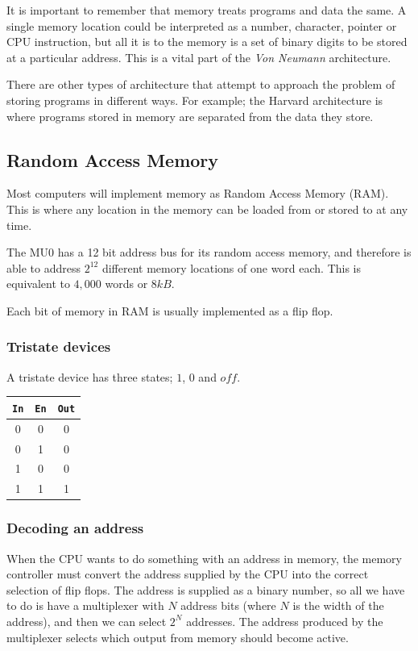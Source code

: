 It is important to remember that memory treats programs and data the same. A
single memory location could be interpreted as a number, character, pointer or
CPU instruction, but all it is to the memory is a set of binary digits to be
stored at a particular address. This is a vital part of the {\it Von Neumann}
architecture.

There are other types of architecture that attempt to approach the problem of
storing programs in different ways. For example; the Harvard architecture is
where programs stored in memory are separated from the data they store.

\subsection{Random Access Memory}

Most computers will implement memory as Random Access Memory (RAM). This is
where any location in the memory can be loaded from or stored to at any time.

The MU0 has a 12 bit address bus for its random access memory, and therefore is
able to address $2^12$ different memory locations of one word each. This is
equivalent to $4,000$ words or $8kB$.

Each bit of memory in RAM is usually implemented as a flip flop.

\subsubsection{Tristate devices}

A tristate device has three states; $1$, $0$ and $off$.

\begin{center}
	\begin{tabular}{|c|c|c|}
		{\tt In} & {\tt En} & {\tt Out}\\ \hline
		0 & 0 & 0\\
		0 & 1 & 0\\
		1 & 0 & 0\\
		1 & 1 & 1\\
	\end{tabular}
\end{center}

\subsubsection{Decoding an address}

When the CPU wants to do something with an address in memory, the memory
controller must convert the address supplied by the CPU into the correct
selection of flip flops. The address is supplied as a binary number, so all we
have to do is have a multiplexer with $N$ address bits (where $N$ is the width
of the address), and then we can select $2^N$ addresses. The address produced by
the multiplexer selects which output from memory should become active.

